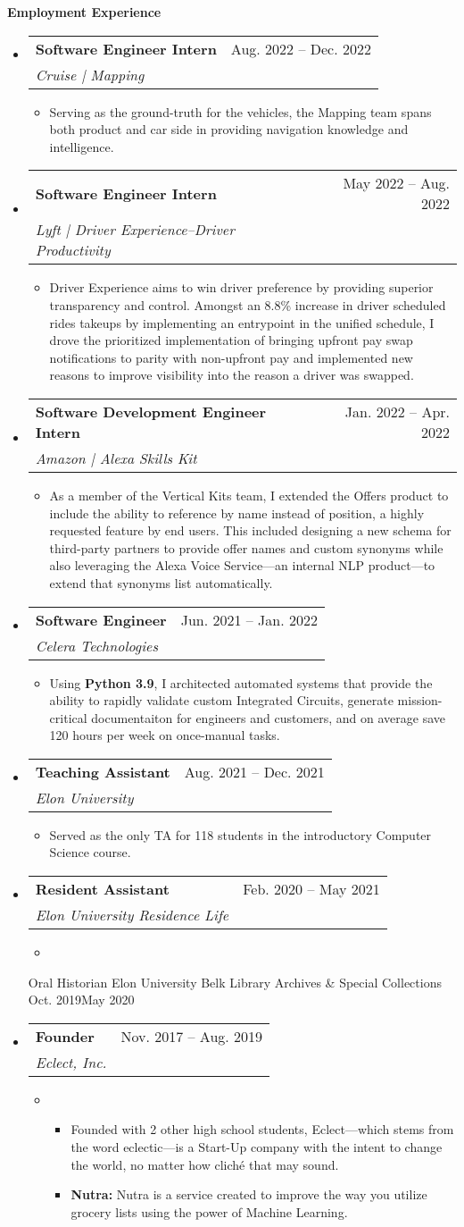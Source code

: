 \documentclass[letterpaper,10pt,draft]{article}
\makeatletter
\newlength{\outerbordwidth}
\newcommand{\openitem}[2]{\item[] \textbf{#1} #2\vspace{2pt}}
\newcommand{\secheading}[1]{\vspace{2pt}
{
\setlength{\FrameSep}{\outerbordwidth}
\textbf{\large #1}
}
}
\newcommand{\secsubheading}[4]{
\vspace{2pt}
\begin{tabular*}{6.86in}{l@{\cftdotfill{\cftsecdotsep}\extracolsep{\fill}}r}
\textbf{#1} & #3 -- #4\\
\textit{#2} \\
\end{tabular*}
}
\newcommand{\secitem}[5]{
\item[]
\secsubheading{#1}{#2}{#3}{#4}
\vspace{-10pt}
\begin{itemize}
\item[]{#5}
\end{itemize}
}
\makeatother
\begin{document}
\secheading{Employment Experience}
\begin{itemize}
\secitem{Software Engineer Intern}
{Cruise | Mapping}
{Aug. 2022}{Dec. 2022}
{Serving as the ground-truth for the vehicles, the Mapping team spans both product and car side in providing navigation knowledge and intelligence.}

\secitem{Software Engineer Intern}
{Lyft | Driver Experience--Driver Productivity}
{May 2022}{Aug. 2022}
{Driver Experience aims to win driver preference by providing superior transparency and control. Amongst an 8.8\% increase in driver scheduled rides takeups by implementing an entrypoint in the unified schedule, I drove the prioritized implementation of bringing upfront pay swap notifications to parity with non-upfront pay and implemented new reasons to improve visibility into the reason a driver was swapped.}

\secitem{Software Development Engineer Intern}
{Amazon | Alexa Skills Kit}
{Jan. 2022}{Apr. 2022}
{As a member of the Vertical Kits team, I extended the Offers product to include the ability to reference by name instead of position, a highly requested feature by end users. This included designing a new schema for third-party partners to provide offer names and custom synonyms while also leveraging the Alexa Voice Service—an internal NLP product—to extend that synonyms list automatically.}

\secitem{Software Engineer}
{Celera Technologies}
{Jun. 2021}{Jan. 2022}
{Using \textbf{Python 3.9}, I architected automated systems that provide the ability to rapidly validate custom Integrated Circuits, generate mission-critical documentaiton for engineers and customers, and on average save 120 hours per week on once-manual tasks.}

\secitem{Teaching Assistant}
{Elon University}
{Aug. 2021}{Dec. 2021}
{Served as the only TA for 118 students in the introductory Computer Science course.}

\secitem{Resident Assistant}
{Elon University Residence Life}
{Feb. 2020}{May 2021}

\secitem{Oral Historian}
{Elon University Belk Library Archives \& Special Collections}
{Oct. 2019}{May 2020}

\secitem{Founder}
{Eclect, Inc.}
{Nov. 2017}{Aug. 2019}
{
\begin{itemize}
\openitem{}{Founded with 2 other high school students, Eclect---which stems from the word eclectic---is a Start-Up company with the intent to change the world, no matter how clich\'e that may sound.}
\openitem{\bf Nutra:}{Nutra is a service created to improve the way you utilize grocery lists using the power of Machine Learning.}
\end{itemize}
}


\end{itemize}
\end{document}
